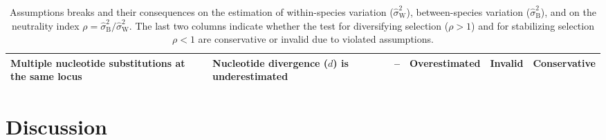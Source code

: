 \documentclass{article}
\newcommand{\RateBetween}{\sigma^2_{\mathrm{B}}}
\newcommand{\RateWhithin}{\sigma^2_{\mathrm{W}}}
\newcommand{\EstRateBetween}{\widehat{\sigma}^2_{\mathrm{B}}}
\newcommand{\EstRateWhithin}{\widehat{\sigma}^2_{\mathrm{W}}}
\newcommand{\NI}{\rho}
\providecommand{\DIFaddtex}[1]{{\protect\color{blue}\uwave{#1}}} %
\providecommand{\DIFdeltex}[1]{{\protect\color{red}\sout{#1}}}                      %
\providecommand{\DIFaddFL}[1]{\DIFadd{#1}} %
\providecommand{\DIFdelFL}[1]{\DIFdel{#1}} %
\providecommand{\DIFaddbeginFL}{} %
\providecommand{\DIFaddendFL}{} %
\providecommand{\DIFdelbeginFL}{} %
\providecommand{\DIFdelendFL}{} %
\providecommand{\DIFadd}[1]{\texorpdfstring{\DIFaddtex{#1}}{#1}} %
\providecommand{\DIFdel}[1]{\texorpdfstring{\DIFdeltex{#1}}{}} %
\newcommand{\DIFscaledelfig}{0.5}
\newlength{\DIFdelgraphicswidth} %
\newlength{\DIFdelgraphicsheight} %
\newcommand{\DIFaddincludegraphics}[2][]{{\color{blue}\fbox{\DIFOincludegraphics[#1]{#2}}}} %
\newcommand{\DIFdelincludegraphics}[2][]{%
\sbox{\DIFdelgraphicsbox}{\DIFOincludegraphics[#1]{#2}}%
\settoboxwidth{\DIFdelgraphicswidth}{\DIFdelgraphicsbox} %
\settoboxtotalheight{\DIFdelgraphicsheight}{\DIFdelgraphicsbox} %
\scalebox{\DIFscaledelfig}{%
\parbox[b]{\DIFdelgraphicswidth}{\usebox{\DIFdelgraphicsbox}\\[-\baselineskip] \rule{\DIFdelgraphicswidth}{0em}}\llap{\resizebox{\DIFdelgraphicswidth}{\DIFdelgraphicsheight}{%
\setlength{\unitlength}{\DIFdelgraphicswidth}%
\begin{picture}(1,1)%
\thicklines\linethickness{2pt} %
{\color[rgb]{1,0,0}\put(0,0){\framebox(1,1){}}}%
{\color[rgb]{1,0,0}\put(0,0){\line( 1,1){1}}}%
{\color[rgb]{1,0,0}\put(0,1){\line(1,-1){1}}}%
\end{picture}%
}\hspace*{3pt}}} %
} %
\DeclareRobustCommand{\DIFaddbeginFL}{\DIFOaddbeginFL \let\includegraphics\DIFaddincludegraphics} %
\DeclareRobustCommand{\DIFaddendFL}{\DIFOaddendFL \let\includegraphics\DIFOincludegraphics} %
\DeclareRobustCommand{\DIFdelbeginFL}{\DIFOdelbeginFL \let\includegraphics\DIFdelincludegraphics} %
\DeclareRobustCommand{\DIFdelendFL}{\DIFOaddendFL \let\includegraphics\DIFOincludegraphics} %
\begin{document}
\begin{table}[t!]
\begin{adjustbox}{width = 1.0\textwidth}
\begin{tabular}{||l|l||c|c||c|c||}
            Multiple nucleotide substitutions at the same locus & Nucleotide divergence ($d$) is underestimated & -- & Overestimated & Invalid & Conservative  \\\hline \hline
        \end{tabular}
    \end{adjustbox}
    \caption{Assumptions breaks and their consequences on the estimation of within-species variation (\DIFdelbeginFL \DIFdelFL{$\EstRateWhithin$}\DIFdelendFL \DIFaddbeginFL \DIFaddFL{$\RateWhithin$}\DIFaddendFL ), between-species variation (\DIFdelbeginFL \DIFdelFL{$\EstRateBetween$}\DIFdelendFL \DIFaddbeginFL \DIFaddFL{$\RateBetween$}\DIFaddendFL ), and on the neutrality index \DIFdelbeginFL \DIFdelFL{$\NI = \EstRateBetween/\EstRateWhithin$}\DIFdelendFL \DIFaddbeginFL \DIFaddFL{$\NI = \RateBetween/\RateWhithin$}\DIFaddendFL .
    The last two columns indicate whether the test for diversifying selection ($\NI > 1$) and for stabilizing selection $\NI < 1$ are conservative or invalid due to violated assumptions.
    }
    \label{table:assumptions}
\end{table}

\section*{Discussion}\label{sec:discussion}
\end{document}
